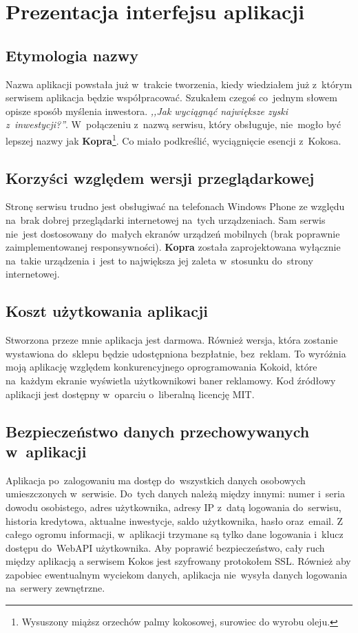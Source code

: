 \documentclass[a4paper,twoside,titlepage,openright]{book}
\begin{document}
\chapter{Prezentacja interfejsu aplikacji}

\section{Etymologia nazwy}

Nazwa aplikacji powstała już w~trakcie tworzenia, kiedy wiedziałem już z~którym serwisem aplikacja będzie współpracować. Szukałem czegoś co~jednym słowem opisze sposób myślenia inwestora. \textit{,,Jak wyciągnąć największe zyski z~inwestycji?''}. W~połączeniu z~nazwą serwisu, który obsługuje, nie~mogło być lepszej nazwy jak \textbf{Kopra}\footnote{Wysuszony miąższ orzechów palmy kokosowej, surowiec do wyrobu oleju.}. Co miało podkreślić, wyciągnięcie esencji z~Kokosa.

\section{Korzyści względem wersji przeglądarkowej}

Stronę serwisu trudno jest obsługiwać na telefonach Windows Phone ze względu na~brak dobrej przeglądarki internetowej na~tych urządzeniach. Sam serwis nie~jest dostosowany do~małych ekranów urządzeń mobilnych (brak poprawnie zaimplementowanej responsywności). \textbf{Kopra} została zaprojektowana wyłącznie na~takie urządzenia i~jest to największa jej zaleta w~stosunku do~strony internetowej. 

\section{Koszt użytkowania aplikacji}

Stworzona przeze mnie aplikacja jest darmowa. Również wersja, która zostanie wystawiona do~sklepu będzie udostępniona bezpłatnie, bez~reklam. To wyróżnia moją aplikację względem konkurencyjnego oprogramowania Kokoid, które na~każdym ekranie wyświetla użytkownikowi baner reklamowy. Kod źródłowy aplikacji jest dostępny w~oparciu o~liberalną licencję MIT.

\section{Bezpieczeństwo danych przechowywanych w~aplikacji}

Aplikacja po~zalogowaniu ma dostęp do~wszystkich danych osobowych umieszczonych w~serwisie. Do~tych danych należą między innymi: numer i~seria dowodu osobistego, adres użytkownika, adresy IP z~datą logowania do~serwisu, historia kredytowa, aktualne inwestycje, saldo użytkownika, hasło oraz~email. Z całego ogromu informacji, w~aplikacji trzymane są tylko dane logowania i~klucz dostępu do~WebAPI użytkownika. Aby poprawić bezpieczeństwo, cały ruch między aplikacją a serwisem Kokos jest szyfrowany protokołem SSL. Również aby zapobiec ewentualnym wyciekom danych, aplikacja nie~wysyła danych logowania na~serwery zewnętrzne.
\end{document}
